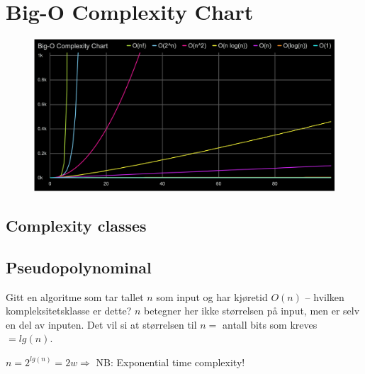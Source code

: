 \documentclass[a4paper, 10pt]{article}
\begin{document}
\section{Big-O Complexity Chart}
\begin{figure}[hbt]
    \begin{center}
        \includegraphics[width=12cm] {img/bigocomchart.png}
    \end{center}
\end{figure}

\newpage

\subsection{Complexity classes}


\begin{enumerate}
	\item Constant: $1$
	\item Polylogarithm: ${(log_{b}n})^{k}}$
	\item Polynominal: $n^k$
	\item Exponential: $2n$
	\item Factorial: $n!$
	\item Worse: $n^n$
\end{enumerate}

\subsection{Pseudopolynominal}

Gitt en algoritme som tar tallet $n$ som input og har kjøretid $O(n)$ – hvilken kompleksitetsklasse er dette? $n$ betegner her ikke størrelsen på input, men er selv en del av inputen. Det vil si at størrelsen til $n =$ antall bits som kreves $= lg(n)$. 

\begin{center}
$n = {2^{lg(n)}} = 2w \Rightarrow$ NB: Exponential time complexity! \
\end{center}
\end{document}
